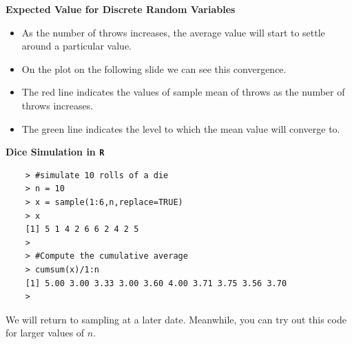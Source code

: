 \documentclass[00-IntroStatsMaster.tex]{subfiles}
\begin{document}
{
	\textbf{Expected Value for Discrete Random Variables}
	\begin{itemize}
		\item As the number of throws increases, the average value will start to settle around a particular value.
		\item On the plot on the following slide we can see this convergence.
		\item The red line indicates the values of sample mean of throws as the number of throws increases.
		\item The green line indicates the level to which the mean value will converge to.
	\end{itemize}
	
}


	\textbf{Dice Simulation in \texttt{R}}
	\begin{verbatim}
	> #simulate 10 rolls of a die
	> n = 10
	> x = sample(1:6,n,replace=TRUE)
	> x
	[1] 5 1 4 2 6 6 2 4 2 5
	>
	> #Compute the cumulative average
	> cumsum(x)/1:n
	[1] 5.00 3.00 3.33 3.00 3.60 4.00 3.71 3.75 3.56 3.70
	> 
	\end{verbatim}
	We will return to sampling at a later date. Meanwhile, you can try out this code for larger values of $n$.
	
\end{document}
